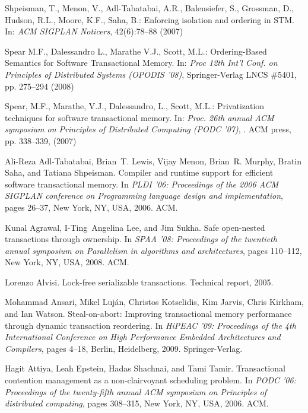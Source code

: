 \begin{thebibliography}{99}
{
 Shpeisman, T.,  Menon, V.,  Adl-Tabatabai, A.R.,  Balensiefer, S.,  Grossman, D.,
 Hudson, R.L., Moore, K.F., Saha, B.:
Enforcing isolation and ordering in STM. 
In: {\it ACM  SIGPLAN Noticers}, 42(6):78--88  (2007)

Spear M.F.,  Dalessandro L.,  Marathe V.J.,  Scott, M.L.:
Ordering-Based Semantics for Software Transactional Memory. 
In: {\it Proc  12th Int'l Conf. on Principles of Distributed Systems 
(OPODIS '08)},  Springer-Verlag LNCS \#5401, pp. 275--294 (2008) 

Spear, M.F.,  Marathe, V.J.,  Dalessandro, L.,  Scott, M.L.: 
Privatization techniques for software transactional memory. 
In: {\it Proc. 26th  annual ACM symposium on Principles of Distributed Computing 
(PODC '07)}, . ACM press, pp.  338--339, (2007)













Ali-Reza Adl-Tabatabai, Brian~T. Lewis, Vijay Menon, Brian~R. Murphy, Bratin
  Saha, and Tatiana Shpeisman.
\newblock Compiler and runtime support for efficient software transactional
  memory.
\newblock In {\em PLDI '06: Proceedings of the 2006 ACM SIGPLAN conference on
  Programming language design and implementation}, pages 26--37, New York, NY,
  USA, 2006. ACM.

Kunal Agrawal, I-Ting~Angelina Lee, and Jim Sukha.
\newblock Safe open-nested transactions through ownership.
\newblock In {\em SPAA '08: Proceedings of the twentieth annual symposium on
  Parallelism in algorithms and architectures}, pages 110--112, New York, NY,
  USA, 2008. ACM.

Lorenzo Alvisi.
\newblock Lock-free serializable transactions.
\newblock Technical report, 2005.

Mohammad Ansari, Mikel Luj\'{a}n, Christos Kotselidis, Kim Jarvis, Chris
  Kirkham, and Ian Watson.
\newblock Steal-on-abort: Improving transactional memory performance through
  dynamic transaction reordering.
\newblock In {\em HiPEAC '09: Proceedings of the 4th International Conference
  on High Performance Embedded Architectures and Compilers}, pages 4--18,
  Berlin, Heidelberg, 2009. Springer-Verlag.

Hagit Attiya, Leah Epstein, Hadas Shachnai, and Tami Tamir.
\newblock Transactional contention management as a non-clairvoyant scheduling
  problem.
\newblock In {\em PODC '06: Proceedings of the twenty-fifth annual ACM
  symposium on Principles of distributed computing}, pages 308--315, New York,
  NY, USA, 2006. ACM.

}
\end{thebibliography}
